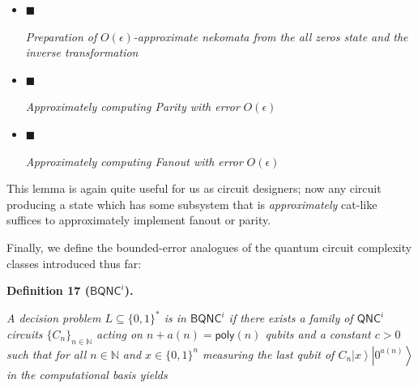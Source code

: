 \documentclass[10pt,a4paper]{article}
\begin{document}
\begin{itemize}


\item[] 
$\blacksquare$ 


\emph{Preparation of }$O(\epsilon)$\emph{-approximate nekomata from the all zeros state and the inverse transformation}\par





\item[] 
$\blacksquare$ 


\emph{Approximately computing Parity with error }$O(\epsilon)$\emph{}\par





\item[] 
$\blacksquare$ 


\emph{Approximately computing Fanout with error }$O(\epsilon)$\emph{}\par





\end{itemize}






This lemma is again quite useful for us as circuit designers; now any circuit producing a state which has some subsystem that is \emph{approximately} cat-like suffices to approximately implement fanout or parity.\par




Finally, we define the bounded-error analogues of the quantum circuit complexity classes introduced thus far:\par





\par\medskip\noindent\textbf{
\textbf{Definition 17}\textbf{ }(${\mathsf{BQNC}}^{i}$)\textbf{.}
}\par



\emph{A decision problem $L\subseteq\{0,1\}^{*}$ is in ${\mathsf{BQNC}}^{i}$ if there exists a family of ${\mathsf{QNC}}^{i}$ circuits $\{C_{n}\}_{n\in\mathbb{N}}$ acting on $n+a(n)={\mathsf{poly}}(n)$ qubits and a constant $c>0$ such that for all $n\in\mathbb{N}$ and $x\in\{0,1\}^{n}$ measuring the last qubit of $C_{n}\left|x\right\rangle\left|0^{a(n)}\right\rangle$ in the computational basis yields}\par
\end{document}
